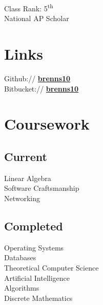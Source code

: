\documentclass[letterpaper]{deedy-resume} %
\begin{document}
\begin{minipage}[t]{0.33\textwidth}
Class Rank: 5\textsuperscript{th} \\
National AP Scholar \\

\sectionspace %


\section{Links}

Github:// \href{https://github.com/brenns10}{\bf brenns10} \\
Bitbucket:// \href{https://bitbucket.org/brenns10}{\bf brenns10} \\

\sectionspace %


\section{Coursework}

\subsection{Current}

Linear Algebra \\
Software Craftsmanship \\
Networking

\sectionspace %


\subsection{Completed}

Operating Systems \\
Databases \\
Theoretical Computer Science \\
Artificial Intelligence \\
Algorithms \\
Discrete Mathematics



\end{minipage}
\end{document}
